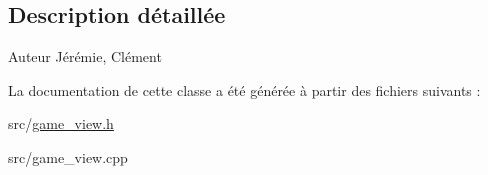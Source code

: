 \subsection{Description détaillée}
\begin{DoxyAuthor}{Auteur}
Jérémie, Clément 
\end{DoxyAuthor}


La documentation de cette classe a été générée à partir des fichiers suivants \+:\begin{DoxyCompactItemize}
\item 
src/\hyperlink{game__view_8h}{game\+\_\+view.\+h}\item 
src/game\+\_\+view.\+cpp\end{DoxyCompactItemize}
